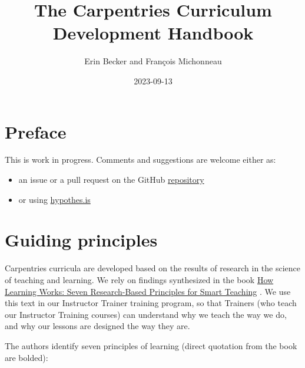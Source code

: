 \documentclass[
]{book}
\title{The Carpentries Curriculum Development Handbook}
\author{Erin Becker and François Michonneau}
\date{2023-09-13}
\providecommand{\tightlist}{%
  \setlength{\itemsep}{0pt}\setlength{\parskip}{0pt}}
\begin{document}
\maketitle

{
\setcounter{tocdepth}{1}
\tableofcontents
}
\hypertarget{preface}{%
\chapter*{Preface}\label{preface}}

This is work in progress. Comments and suggestions are welcome either as:

\begin{itemize}
\tightlist
\item
  an issue or a pull request on the GitHub \href{https://github.com/carpentries/curriculum-development}{repository}
\item
  or using \href{https://web.hypothes.is/start/}{hypothes.is}
\end{itemize}

\hypertarget{guiding-principles}{%
\chapter{Guiding principles}\label{guiding-principles}}

Carpentries curricula are developed based on the results of research in the science of
teaching and learning. We rely on findings synthesized in the book
\href{https://www.wiley.com/en-us/How+Learning+Works\%3A+Seven+Research+Based+Principles+for+Smart+Teaching-p-9780470484104}{How Learning Works: Seven Research-Based Principles for Smart Teaching} \citep{ambrose2010learning}. We use this text in our Instructor Trainer training program, so that
Trainers (who teach our Instructor Training courses) can understand why we teach the way we
do, and why our lessons are designed the way they are.

The authors identify seven principles of learning (direct quotation from the book are bolded):
\end{document}
